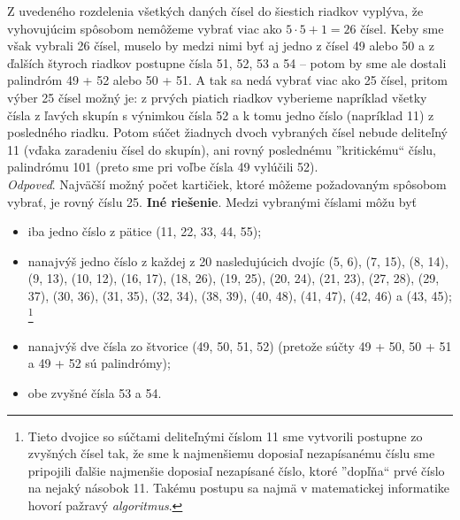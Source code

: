 Z uvedeného rozdelenia všetkých daných čísel do šiestich riadkov vyplýva, že vyhovujúcim spôsobom nemôžeme vybrať viac ako $5 \cdot 5 + 1 = 26$ čísel. Keby sme však vybrali 26 čísel, muselo by medzi nimi byť aj jedno z čísel 49 alebo 50 a z ďalších štyroch riadkov postupne čísla 51, 52, 53 a 54 -- potom by sme ale dostali palindróm 49 + 52 alebo 50 + 51. A tak sa nedá vybrať viac ako 25 čísel, pritom výber 25 čísel možný je: z prvých piatich riadkov vyberieme napríklad všetky čísla z ľavých skupín s výnimkou čísla 52 a k tomu jedno číslo (napríklad 11) z posledného riadku. Potom súčet žiadnych dvoch vybraných čísel nebude deliteľný 11 (vďaka zaradeniu čísel do skupín), ani rovný poslednému ”kritickému“ číslu, palindrómu 101 (preto sme pri voľbe čísla 49 vylúčili 52).\\
\textit{Odpoveď}. Najväčší možný počet kartičiek, ktoré môžeme požadovaným spôsobom vybrať, je rovný číslu 25.
\textbf{Iné riešenie}. Medzi vybranými číslami môžu byť
\begin{itemize}
\item iba jedno číslo z pätice (11, 22, 33, 44, 55);
\item nanajvýš jedno číslo z každej z 20 nasledujúcich dvojíc (5, 6), (7, 15), (8, 14), (9, 13), (10, 12), (16, 17), (18, 26), (19, 25), (20, 24), (21, 23), (27, 28), (29, 37), (30, 36), (31, 35), (32, 34), (38, 39), (40, 48), (41, 47), (42, 46) a (43, 45); \footnote{Tieto dvojice so súčtami deliteľnými číslom 11 sme vytvorili postupne zo zvyšných čísel tak, že sme k najmenšiemu doposiaľ nezapísanému číslu sme pripojili ďalšie najmenšie doposiaľ nezapísané číslo, ktoré ”dopľňa“ prvé číslo na nejaký násobok 11. Takému postupu sa najmä v matematickej
informatike hovorí pažravý \textit{algoritmus}.}
\item nanajvýš dve čísla zo štvorice (49, 50, 51, 52) (pretože súčty 49 + 50, 50 + 51 a 49 + 52 sú palindrómy);
\item obe zvyšné čísla 53 a 54.
\end{itemize}

